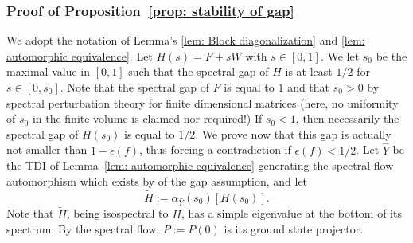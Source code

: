 \subsubsection{Proof of Proposition~\ref{prop: stability of gap}}
We adopt the notation of Lemma's \ref{lem: Block diagonalization}  and \ref{lem: automorphic equivalence}. 
Let $H(s)=F+sW$ with $s\in[0,1]$. We let $s_0$ be the maximal value in $[0,1]$ such that the spectral gap of $H$ is at least $1/2$ for $s\in [0,s_0]$.  Note that the spectral gap of $F$ is equal to $1$ and that
$s_0>0$ by spectral perturbation theory for finite dimensional matrices (here, no uniformity of $s_0$ in the finite volume is claimed nor required!) If $s_0<1$, then necessarily the spectral gap of $H(s_0)$ is equal to $1/2$. We prove now that this gap is actually not smaller than $1-\epsilon(f)$, thus forcing a contradiction if $\epsilon(f)<1/2$. Let $\hat Y$ be the TDI of Lemma~\ref{lem: automorphic equivalence} generating the spectral flow automorphism which exists by of the gap assumption, and let 
$$
\widetilde H:= \alpha_{\hat Y}(s_0)[H(s_0)] .
$$
Note that $\widetilde H$, being isospectral to $H$, has a simple eigenvalue at the bottom of its spectrum.  By the spectral flow, $P:=P(0)$ is its ground state projector. 

